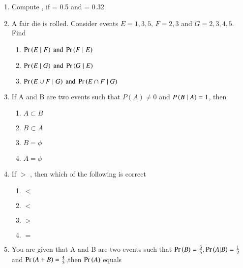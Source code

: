 \begin{enumerate}[label=\thesubsection.\arabic*,ref=\thesubsection.\theenumi]
\begin{enumerate}
\item {} \item {}
\end{enumerate}
\solution
%
\item Compute  , if  = 0.5 and  = 0.32.\\
	\solution
\item A fair die is rolled. Consider events $E=1,3,5,\, F=2,3$ and $G=2,3,4,5$. Find
\begin{enumerate}
\item $\Pr\left(E \mid F\right) \text{ and } \Pr\left(F \mid E\right)$
\item $\Pr\left(E \mid G\right) \text{ and } \Pr\left(G \mid E\right)$
\item $\Pr\left({E \cup F} \mid G\right) \text{ and } \Pr\left({E \cap F} \mid G\right)$
\end{enumerate}
%
\solution
%
	\item If A and B are two events such that $P(A) \neq 0$ and $P\left(B\mid A\right) = 1$, then
\begin{enumerate}
\item $A \subset B$\\
\item $B\subset A$\\
\item $B = \phi$\\
\item $A = \phi$\\
\end{enumerate}
		\solution
	\item If  $>$ , then which of the following is correct 
\begin{enumerate}
 \item {} $<$  \\
 \item {} $<$     \\
 \item {} $>$  \label{eq:ncert/12/13/6/18/c}\\ 
 \item {} $=$  \\
\end{enumerate}
		\solution
\item You are given that A and B are two events such that $\Pr\left(B\right)=\frac{3}{5},\Pr\left(A|B\right)=\frac{1}{2}$ and $\Pr\left(A+B\right)=\frac{4}{5}$,then $\Pr\left(A\right)$ equals\\

\end{enumerate}
